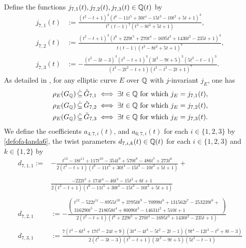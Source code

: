 Define the functions $j_{7,1}(t), j_{7,2}(t), j_{7,3}(t) \in \mathbb{Q}(t)$ by
\begin{equation} \label{tildeGlevel7jinvariants}
\begin{split}
j_{7,1}(t) &:= \frac{(t^2 - t + 1)^3(t^6 - 11t^5 + 30t^4 - 15t^3 - 10t^2 + 5t + 1)^3}{t^7(t-1)^7(t^3 - 8t^2 + 5t + 1)}, \\
j_{7,2}(t) &:= \frac{(t^2 - t + 1)^3(t^6 + 229t^5 + 270t^4 - 1695t^3 + 1430t^2 - 235t + 1)^3}{t(t-1)(t^3 - 8t^2 + 5t + 1)^7}, \\
j_{7,3}(t) &:= - \frac{(t^2 - 3t - 3)^3(t^2 - t + 1)^3(3t^2 - 9t + 5)^3(5t^2 - t - 1)^3}{(t^3 - 2t^2 - t + 1)(t^3 - t^2 - 2t + 1)^7}.
\end{split}
\end{equation}
As detailed in \cite{zywina}, for any elliptic curve $E$ over $\mathbb{Q}$ with $j$-invariant $j_E$, one has
\begin{equation} \label{level7jinvariantstatement}
\begin{split}
\rho_{E}(G_{\mathbb{Q}}) \, \dot\subseteq \, \tilde{G}_{7,1} \; &\Longleftrightarrow \; \exists t \in \mathbb{Q} \text{ for which } j_E = j_{7,1}(t), \\
\rho_{E}(G_{\mathbb{Q}}) \, \dot\subseteq \, \tilde{G}_{7,2} \; &\Longleftrightarrow \; \exists t \in \mathbb{Q} \text{ for which } j_E = j_{7,2}(t), \\
\rho_{E}(G_{\mathbb{Q}}) \, \dot\subseteq \, \tilde{G}_{7,3} \; &\Longleftrightarrow \; \exists t \in \mathbb{Q} \text{ for which } j_E = j_{7,3}(t).
\end{split}
\end{equation}
We define the coefficients $a_{4;7,i}(t)$, and $a_{6;7,i}(t)$ for each $i \in \{1, 2, 3\}$ by \eqref{defofa4anda6}, the twist parameters $d_{7,i,k}(t) \in \mathbb{Q}(t)$ for each $i \in \{ 1, 2, 3 \}$ and $k \in \{1, 2\}$ by
\[
\begin{split}
d_{7,1,1} :=& - \frac{t^{12} - 18t^{11} + 117t^{10} - 354t^9 + 570t^8 - 486t^7 + 273t^6}{2(t^2 - t + 1)(t^6 - 11t^5 + 30t^4 - 15t^3 - 10t^2 + 5t + 1)} +\\
\\
&\frac{- 222t^5 + 174t^4 - 46t^3 - 15t^2 + 6t + 1}{2(t^2 - t + 1)(t^6 - 11t^5 + 30t^4 - 15t^3 - 10t^2 + 5t + 1)}\\
\\
d_{7,2,1} &:= - \frac{\begin{pmatrix} t^{12} - 522t^{11} - 8955t^{10} + 37950t^9 - 70998t^8 + 131562t^7 - 253239t^6 + \\ 316290t^5 - 218058t^4 + 80090t^3 - 14631t^2 + 510t + 1 \end{pmatrix}}{2(t^2 - t + 1)(t^6 + 229t^5 + 270t^4 - 1695t^3 + 1430t^2 - 235t + 1)} \\
\\
d_{7,3,1} &:= \frac{7(t^4 - 6t^3 + 17t^2 - 24t + 9)(3t^4 - 4t^3 - 5t^2 - 2t - 1)(9t^4 - 12t^3 - t^2 + 8t - 3)}{2(t^2 - 3t - 3)(t^2 - t + 1)(3t^2 - 9t + 5)(5t^2 - t - 1)}
\end{split}
\]
